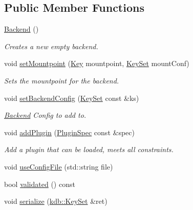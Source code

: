 \subsection*{Public Member Functions}
\begin{DoxyCompactItemize}
\item 
\mbox{\label{classkdb_1_1tools_1_1Backend_a1650b149ebf313ee8cd3472247212263}} 
\mbox{\hyperlink{classkdb_1_1tools_1_1Backend_a1650b149ebf313ee8cd3472247212263}{Backend}} ()
\begin{DoxyCompactList}\small\item\em Creates a new empty backend. \end{DoxyCompactList}\item 
void \mbox{\hyperlink{classkdb_1_1tools_1_1Backend_ac61b2628800a6fd0a6620ff47bfb3be9}{set\+Mountpoint}} (\mbox{\hyperlink{classkdb_1_1Key}{Key}} mountpoint, \mbox{\hyperlink{classkdb_1_1KeySet}{Key\+Set}} mount\+Conf)
\begin{DoxyCompactList}\small\item\em Sets the mountpoint for the backend. \end{DoxyCompactList}\item 
void \mbox{\hyperlink{classkdb_1_1tools_1_1Backend_aa7aa17a1c97cdfa48bcebadb7bc00247}{set\+Backend\+Config}} (\mbox{\hyperlink{classkdb_1_1KeySet}{Key\+Set}} const \&ks)
\begin{DoxyCompactList}\small\item\em \mbox{\hyperlink{classkdb_1_1tools_1_1Backend}{Backend}} Config to add to. \end{DoxyCompactList}\item 
void \mbox{\hyperlink{classkdb_1_1tools_1_1Backend_a2cce1cc51617baa5431a6036f5cfe05b}{add\+Plugin}} (\mbox{\hyperlink{classkdb_1_1tools_1_1PluginSpec}{Plugin\+Spec}} const \&spec)
\begin{DoxyCompactList}\small\item\em Add a plugin that can be loaded, meets all constraints. \end{DoxyCompactList}\item 
void \mbox{\hyperlink{classkdb_1_1tools_1_1Backend_a5c72747e5419d7802849cfc2eb4064d2}{use\+Config\+File}} (std\+::string file)
\item 
bool \mbox{\hyperlink{classkdb_1_1tools_1_1Backend_a7b28929231bc592c1a83f42121405496}{validated}} () const
\item 
void \mbox{\hyperlink{classkdb_1_1tools_1_1Backend_a93638ae12d8880bdb528ae709c857be7}{serialize}} (\mbox{\hyperlink{classkdb_1_1KeySet}{kdb\+::\+Key\+Set}} \&ret)
\end{DoxyCompactItemize}


